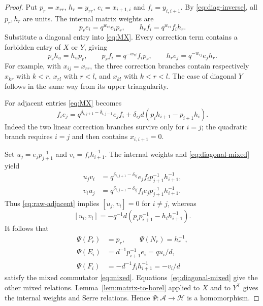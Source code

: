 \documentclass[11pt]{article}
\theoremstyle{definition}
\theoremstyle{remark}
\newcommand{\cA}{\mathcal{A}}
\newcommand{\cH}{\mathcal{H}}
\begin{document}
\begin{proof}
Put $p_r=x_{rr}$, $h_r=y_{rr}$, $e_i=x_{i+1,i}$ and $f_i=y_{i,i+1}$. By \eqref{eq:diag-inverse}, all $p_r,h_r$ are units. The internal matrix weights are
\[
 p_re_i=q^{w_{ri}}e_ip_r,\qquad h_rf_i=q^{w_{ri}}f_ih_r.
\]
Substitute a diagonal entry into \eqref{eq:MX}. Every correction term contains a forbidden entry of $X$ or $Y$, giving
\begin{equation}\label{eq:diagonal-mixed}
 p_rh_u=h_up_r,\qquad p_rf_i=q^{-w_{ri}}f_ip_r,\qquad
 h_re_j=q^{-w_{rj}}e_jh_r.
\end{equation}
For example, with $x_{ij}=x_{rr}$, the three correction branches contain respectively $x_{kr}$ with $k<r$, $x_{rl}$ with $r<l$, and $x_{kl}$ with $k<r<l$. The case of diagonal $Y$ follows in the same way from its upper triangularity.

For adjacent entries \eqref{eq:MX} becomes
\begin{equation}\label{eq:raw-adjacent}
 f_ie_j=q^{\delta_{i,j+1}-\delta_{i,j-1}}e_jf_i
 +\delta_{ij}d(p_ih_{i+1}-p_{i+1}h_i).
\end{equation}
Indeed the two linear correction branches survive only for $i=j$; the quadratic branch requires $i=j$ and then contains $x_{i,i+1}=0$.

Set $u_j=e_jp_{j+1}^{-1}$ and $v_i=f_ih_{i+1}^{-1}$. The internal weights and \eqref{eq:diagonal-mixed} yield
\[
 \begin{aligned}
 u_jv_i&=q^{\delta_{i,j+1}-\delta_{ij}}e_jf_i p_{j+1}^{-1}h_{i+1}^{-1},\\
 v_iu_j&=q^{\delta_{i,j-1}-\delta_{ij}}f_ie_j p_{j+1}^{-1}h_{i+1}^{-1}.
 \end{aligned}
\]
Thus \eqref{eq:raw-adjacent} implies $[u_j,v_i]=0$ for $i\ne j$, whereas
\[
 [u_i,v_i]=-q^{-1}d(p_ip_{i+1}^{-1}-h_ih_{i+1}^{-1}).
\]
It follows that
\begin{equation}\label{eq:Psi}
 \begin{aligned}
 \Psi(P_r)&=p_r,\qquad\Psi(N_r)=h_r^{-1},\\
 \Psi(E_i)&=d^{-1}p_{i+1}^{-1}e_i=qu_i/d,\\
 \Psi(F_i)&=-d^{-1}f_ih_{i+1}^{-1}=-v_i/d
 \end{aligned}
\end{equation}
satisfy the mixed commutator \eqref{eq:mixed}. Equations~\eqref{eq:diagonal-mixed} give the other mixed relations. Lemma~\ref{lem:matrix-to-borel} applied to $X$ and to $Y^{\mathsf T}$ gives the internal weights and Serre relations. Hence $\Psi:\cA\to\cH$ is a homomorphism.


\end{proof}
\end{document}
